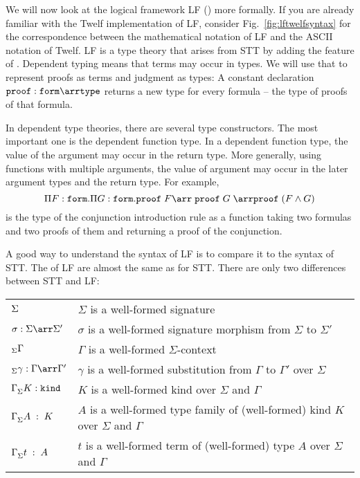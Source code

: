 We will now look at the logical framework LF (\cite{lf}) more formally. If you are already familiar with the Twelf implementation \cite{twelf} of LF, consider Fig.~\ref{fig:lftwelfsyntax} for the correspondence between the mathematical notation of LF and the ASCII notation of Twelf. LF is a type theory that arises from STT by adding the feature of . Dependent typing means that terms may occur in types. We will use that to represent proofs as terms and judgment as types: A constant declaration $\PROOF:\FORM \arr \TYPE$ returns a new type for every formula -- the type of proofs of that formula.

In dependent type theories, there are several type constructors. The most important one is the dependent function type. In a dependent function type, the value of the argument may occur in the return type. More generally, using functions with multiple arguments, the value of argument may occur in the later argument types and the return type. For example,
\[\P{F}{\FORM}\P{G}{\FORM}\PROOF\;F\arr\;\PROOF \;G\;\arr\PROOF\;(F\wedge G)\]
is the type of the conjunction introduction rule as a function taking two formulas and two proofs of them and returning a proof of the conjunction.

A good way to understand the syntax of LF is to compare it to the syntax of STT. The  of LF are almost the same as for STT. There are only two differences between STT and LF:
\begin{center}
	\begin{tabular}{|l|l|}
	  \hline
	  $ \Sigma$   & $\Sigma$ is a well-formed signature \\
	  $\ismorph{\Sigma}{\Sigma'}{\sigma}$  & $\sigma$ is a well-formed signature morphism from $\Sigma$ to $\Sigma'$ \\ $_{\Sigma}\Gamma$  & $\Gamma$ is a well-formed $\Sigma$-context \\
	  $\isdsubs{\Sigma}{\Gamma}{\Gamma'}{\gamma}$  & $\gamma$ is a well-formed substitution from $\Gamma$ to $\Gamma'$ over $\Sigma$ \\
		$\Gamma^{}_{\Sigma}K:\mathtt{kind}$ & $K$ is a well-formed kind over $\Sigma$ and $\Gamma$ \\
		$\Gamma^{}_{\Sigma}A\;:\;K$ & $A$ is a well-formed type family of (well-formed) kind $K$ over $\Sigma$ and $\Gamma$ \\
		$\Gamma^{}_{\Sigma}t\;:\;A$ & $t$ is a well-formed term of (well-formed) type $A$ over $\Sigma$ and $\Gamma$ \\
		\hline
	\end{tabular}
\end{center}

